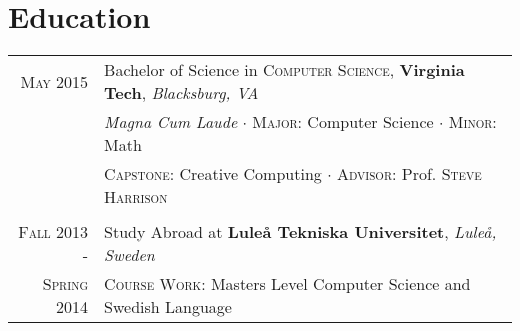 \documentclass[letterpaper,10pt]{article}
\begin{document}
\section{Education}
\begin{tabular}{R|B}
	\textsc{May} 2015                & Bachelor of Science in \textsc{Computer Science}, \textbf{Virginia Tech}, \emph{Blacksburg, VA}     \\
	                                 & \small\emph{Magna Cum Laude} $\cdot$ \textsc{Major}: Computer Science $\cdot$ \textsc{Minor}: Math  \\
	                                 & \small\textsc{Capstone}: Creative Computing $\cdot$ \textsc{Advisor}: Prof. \textsc{Steve Harrison} \\
	                                                                                                                   \\

	\textsc{Fall} 2013 -             & Study Abroad at \textbf{Luleå Tekniska Universitet}, \emph{Luleå, Sweden}                           \\
	\textsc{Spring} 2014\phantom{ -} & \small\textsc{Course Work}: Masters Level Computer Science and Swedish Language
\end{tabular}
\end{document}
